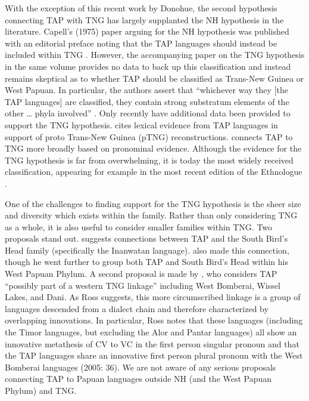 With the exception of this recent work by Donohue, the second hypothesis connecting TAP with TNG has largely supplanted the NH hypothesis in the literature. Capell's (1975) paper arguing for the NH hypothesis was published with an editorial preface noting that the TAP languages should instead be included within TNG \citep[667]{Wurm1975}. However, the accompanying paper on the TNG hypothesis in the same volume provides no data to back up this classification and instead remains skeptical as to whether TAP should be classified as Trans-New Guinea or West Papuan. In particular, the authors assert that ``whichever way they [the TAP languages] are classified, they contain strong substratum elements of the other {\dots} phyla involved'' \citep[318]{WurmEtAl1975}. Only recently have additional data been provided to support the TNG hypothesis. \citet{Pawley2001} cites lexical evidence from TAP languages in support of proto Trans-New Guinea (pTNG) reconstructions. \citet{Ross2005} connects TAP to TNG more broadly based
on pronominal evidence. Although the evidence for the TNG hypothesis is far from overwhelming, it is today the most widely received classification, appearing for example in the most recent edition of the Ethnologue \citep{LewisEtAl2013}.

One of the challenges to finding support for the TNG hypothesis is the sheer size and diversity which exists within the family. Rather than only considering TNG as a whole, it is also useful to consider smaller families within TNG. Two proposals stand out. \citet{Reesink1996} suggests connections between TAP and the South Bird's Head family (specifically the Inanwatan language). \citet{Cowan1953} also made this connection, though he went further to group both TAP and South Bird's Head within his West Papuan Phylum. A second proposal is made by \citet{Ross2005}, who considers TAP ``possibly part of a western TNG linkage'' including West Bomberai, Wissel Lakes, and Dani. As Ross suggests, this more circumscribed linkage is a group of languages descended from a dialect chain and therefore characterized by overlapping innovations. In particular, Ross notes that these languages (including the Timor languages, but excluding the Alor and Pantar languages) all show an innovative metathesis of CV to VC in the first
person singular pronoun and that the TAP languages share an innovative first person plural pronoun with the West Bomberai languages (2005: 36). We are not aware of any serious proposals connecting TAP to Papuan languages outside NH (and the West Papuan Phylum) and TNG.

